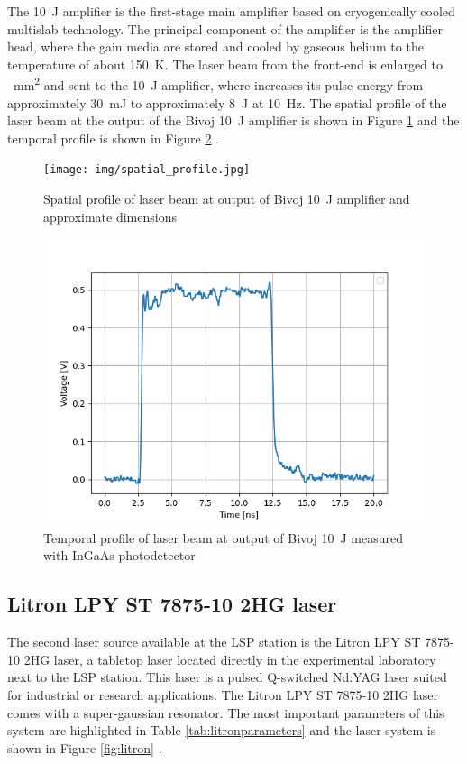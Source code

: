 The \SI{10}{\joule}  amplifier is the first-stage main amplifier based on
cryogenically cooled multislab technology. The principal
component of the amplifier is the amplifier head, where the
gain media are stored and cooled by gaseous helium to 
the temperature of about \SI{150}{\kelvin}. The laser beam from the front-end
is enlarged to  \SI{}{\mm\squared} and sent to the \SI{10}{\joule} amplifier, where
increases its pulse energy from approximately \SI{30}{\milli\joule} to
approximately \SI{8}{\joule} at \SI{10}{\hertz}. The spatial profile of the laser beam at the output of the Bivoj \SI{10}{\joule} amplifier is shown in Figure \ref{fig:spatialprofile} and the temporal profile is shown in Figure \ref{fig:temporalprofile} \cite{saumyabrata}.

\begin{figure}[h]
    \centering
    \texttt{[image: img/spatial\_profile.jpg]}
    \caption[Spatial profile of laser beam at output of Bivoj \SI{10}{\joule} amplifier]{Spatial profile of laser beam at output of Bivoj \SI{10}{\joule} amplifier and approximate dimensions \protect\cite{kaufman}}
    \label{fig:spatialprofile}
\end{figure}

\begin{figure}[h]
    \centering
    \includegraphics[width=0.6\linewidth]{img/temporal_profile_bivoj_v_2.png}
    \caption[Temporal profile of laser beam at output of Bivoj \SI{10}{\joule}]{Temporal profile of laser beam at output of Bivoj \SI{10}{\joule} measured with InGaAs photodetector \protect\cite{kaufman}}
    \label{fig:temporalprofile}
\end{figure}

\subsection{Litron LPY ST 7875-10 2HG laser}

The second laser source available at the LSP station is the Litron LPY ST 7875-10 2HG laser, a tabletop laser located directly in the experimental laboratory next to the LSP station. This laser is a pulsed Q-switched Nd:YAG laser suited for industrial or research applications. The Litron  LPY ST 7875-10 2HG laser comes with a super-gaussian resonator. The most important parameters of this system are highlighted in Table \ref{tab:litronparameters} and the laser system is shown in Figure \ref{fig:litron} \cite{litron}. 


